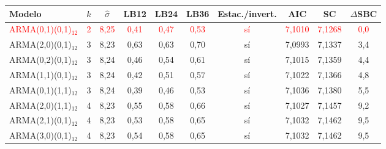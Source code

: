 \begin{tabular}{lccccccccc}
\toprule
Modelo & $k$ & $\hat\sigma$ & LB12 & LB24 & LB36 & Estac./invert. & AIC & SC & $\Delta$SBC
\\ \midrule
\textcolor{red}{ARMA(0,1)(0,1)\ensuremath{_{12}}} & \textcolor{red}{2} & \textcolor{red}{8{,}25} & \textcolor{red}{0{,}41} & \textcolor{red}{0{,}47} & \textcolor{red}{0{,}53} & \textcolor{red}{s\'i} & \textcolor{red}{7{,}1010} & \textcolor{red}{7{,}1268} & \textcolor{red}{0{,}0} \\
ARMA(2,0)(0,1)\ensuremath{_{12}} & 3 & 8{,}23 & 0{,}63 & 0{,}63 & 0{,}70 & s\'i & 7{,}0993 & 7{,}1337 & 3{,}4 \\
ARMA(0,2)(0,1)\ensuremath{_{12}} & 3 & 8{,}24 & 0{,}46 & 0{,}54 & 0{,}61 & s\'i & 7{,}1015 & 7{,}1359 & 4{,}4 \\
ARMA(1,1)(0,1)\ensuremath{_{12}} & 3 & 8{,}24 & 0{,}42 & 0{,}51 & 0{,}57 & s\'i & 7{,}1022 & 7{,}1366 & 4{,}8 \\
ARMA(0,1)(1,1)\ensuremath{_{12}} & 3 & 8{,}24 & 0{,}39 & 0{,}46 & 0{,}53 & s\'i & 7{,}1036 & 7{,}1380 & 5{,}5 \\
ARMA(2,0)(1,1)\ensuremath{_{12}} & 4 & 8{,}23 & 0{,}55 & 0{,}58 & 0{,}66 & s\'i & 7{,}1027 & 7{,}1457 & 9{,}2 \\
ARMA(2,1)(0,1)\ensuremath{_{12}} & 4 & 8{,}23 & 0{,}53 & 0{,}58 & 0{,}65 & s\'i & 7{,}1032 & 7{,}1462 & 9{,}5 \\
ARMA(3,0)(0,1)\ensuremath{_{12}} & 4 & 8{,}23 & 0{,}54 & 0{,}58 & 0{,}65 & s\'i & 7{,}1032 & 7{,}1462 & 9{,}5 \\
\bottomrule
\end{tabular}
